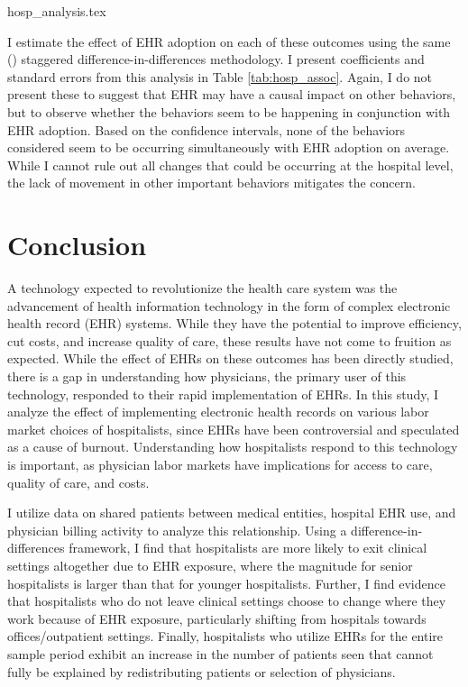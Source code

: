 \documentclass[12pt]{article}
\begin{document}
{hosp_analysis.tex}

I estimate the effect of EHR adoption on each of these outcomes using the same \citeauthor{callaway2021difference} (\citeyear{callaway2021difference}) staggered difference-in-differences methodology. I present coefficients and standard errors from this analysis in Table \ref{tab:hosp_assoc}. Again, I do not present these to suggest that EHR may have a causal impact on other behaviors, but to observe whether the behaviors seem to be happening in conjunction with EHR adoption. Based on the confidence intervals, none of the behaviors considered seem to be occurring simultaneously with EHR adoption on average. While I cannot rule out all changes that could be occurring at the hospital level, the lack of movement in other important behaviors mitigates the concern.

\section{Conclusion}

A technology expected to revolutionize the health care system was the advancement of health information technology in the form of complex electronic health record (EHR) systems. While they have the potential to improve efficiency, cut costs, and increase quality of care, these results have not come to fruition as expected. While the effect of EHRs on these outcomes has been directly studied, there is a gap in understanding how physicians, the primary user of this technology, responded to their rapid implementation of EHRs. In this study, I analyze the effect of implementing electronic health records on various labor market choices of hospitalists, since EHRs have been controversial and speculated as a cause of burnout. Understanding how hospitalists respond to this technology is important, as physician labor markets have implications for access to care, quality of care, and costs. 

I utilize data on shared patients between medical entities, hospital EHR use, and physician billing activity to analyze this relationship. Using a difference-in-differences framework, I find that hospitalists are more likely to exit clinical settings altogether due to EHR exposure, where the magnitude for senior hospitalists is larger than that for younger hospitalists. Further, I find evidence that hospitalists who do not leave clinical settings choose to change where they work because of EHR exposure, particularly shifting from hospitals towards offices/outpatient settings. Finally, hospitalists who utilize EHRs for the entire sample period exhibit an increase in the number of patients seen that cannot fully be explained by redistributing patients or selection of physicians. 
\end{document}
